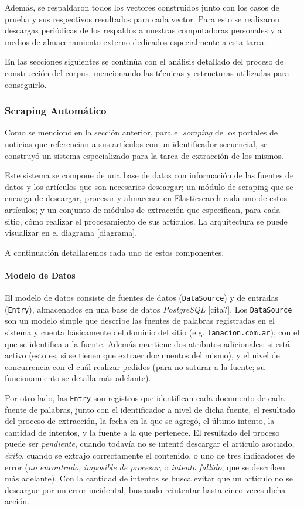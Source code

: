 Además, se respaldaron todos los vectores construidos junto con los casos de prueba y sus respectivos
resultados para cada vector. Para esto se realizaron descargas periódicas de los respaldos a nuestras
computadoras personales y a medios de almacenamiento externo dedicados especialmente a esta
tarea.

En las secciones siguientes se continúa con el análisis detallado del proceso de construcción del corpus,
mencionando las técnicas y estructuras utilizadas para conseguirlo.


\subsubsection{Scraping Automático}

Como se mencionó en la sección anterior, para el \textit{scraping} de los portales de noticias que
referencian a sus artículos con un identificador secuencial, se construyó un sistema especializado
para la tarea de extracción de los mismos.

Este sistema se compone de una base de datos con información de las fuentes de datos y los
artículos que son necesarios descargar; un módulo de scraping que se encarga de descargar, procesar
y almacenar en Elasticsearch cada uno de estos artículos; y un conjunto de módulos de extracción que
especifican, para cada sitio, cómo realizar el procesamiento de sus artículos. La arquitectura se
puede visualizar en el diagrama [diagrama].

A continuación detallaremos cada uno de estos componentes.


\paragraph{Modelo de Datos}

El modelo de datos consiste de fuentes de datos (\texttt{DataSource}) y de entradas
(\texttt{Entry}), almacenados en una base de datos \textit{PostgreSQL} [cita?]. Los
\texttt{DataSource} son un modelo simple que describe las fuentes de palabras registradas en el
sistema y cuenta básicamente del dominio del sitio (e.g. \texttt{lanacion.com.ar}), con el que se
identifica a la fuente. Además mantiene dos atributos adicionales: si está activo (esto es, si se
tienen que extraer documentos del mismo), y el nivel de concurrencia con el cuál realizar pedidos
(para no saturar a la fuente; su funcionamiento se detalla más adelante).

Por otro lado, las \texttt{Entry} son registros que identifican cada documento de cada fuente de
palabras, junto con el identificador a nivel de dicha fuente, el resultado del proceso de
extracción, la fecha en la que se agregó, el último intento, la cantidad de intentos, y la fuente a
la que pertenece. El resultado del proceso puede ser \textit{pendiente}, cuando todavía no se
intentó descargar el artículo asociado, \textit{éxito}, cuando se extrajo correctamente el
contenido, o uno de tres indicadores de error (\textit{no encontrado}, \textit{imposible de
procesar}, o \textit{intento fallido}, que se describen más adelante). Con la cantidad de intentos
se busca evitar que un artículo no se descargue por un error incidental, buscando reintentar hasta
cinco veces dicha acción.

